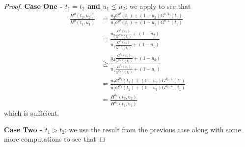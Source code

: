 \documentclass{article}
\begin{document}
\begin{appendix}
\begin{proof}
    \noindent \textbf{Case One -  $t_1 = t_2$ and $u_1 \leq u_2$}: we apply  to see that 
    \begin{align*}
        \frac{H^{\theta}(t_2, u_2)}{H^{\theta}(t_1, u_1)} &= \frac{u_2G^{\theta}(t_1)  + (1-u_2) G^{\theta, +}(t_1)}{u_1 G^{\theta}(t_1)  + (1-u_1) G^{\theta, +}(t_1)}\\
        &= \frac{u_2 \frac{G^{\theta}(t_1)}{G^{\theta, +}(t_1)}   + (1-u_2) }{u_1 \frac{G^{\theta}(t_1)}{G^{\theta, +}(t_1)}  + (1-u_1) }\\
        &\geq \frac{u_2 \frac{G^{\theta_0}(t_1)}{G^{\theta_0, +}(t_1)}   + (1-u_2) }{u_1 \frac{G^{\theta_0}(t_1)}{G^{\theta_0, +}(t_1)}  + (1-u_1) }\\
        &= \frac{u_2G^{\theta_0}(t_1)  + (1-u_2) G^{\theta_0, +}(t_1)}{u_1 G^{\theta_0}(t_1)  + (1-u_1) G^{\theta_0, +}(t_1)}\\
        &=\frac{H^{\theta_0}(t_2, u_2)}{H^{\theta_0}(t_1, u_1)}
    \end{align*}
    which is sufficient. \newline 

    \noindent \textbf{Case Two -  $t_1 > t_2$}: we use the result from the previous case along with some more computations to see that 


\end{proof}
\end{appendix}
\end{document}
